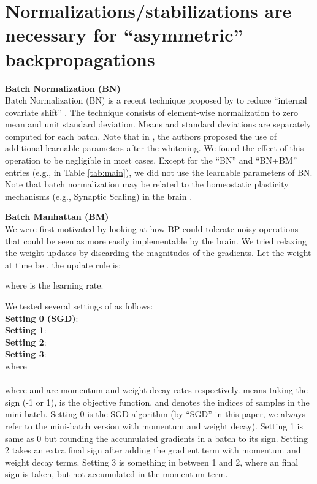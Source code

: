 \documentclass[letterpaper]{article}
\begin{document}
\section{Normalizations/stabilizations are necessary for ``asymmetric'' backpropagations}
\label{sec:normalizations}
\textbf{Batch Normalization (BN)} \\
Batch Normalization (BN) is a recent technique proposed by \cite{ioffe2015batch} to reduce ``internal covariate shift'' \cite{ioffe2015batch}. The technique consists of element-wise normalization to zero mean and unit standard deviation. Means and standard deviations are separately computed for each batch. Note that in \cite{ioffe2015batch}, the authors proposed the use of additional learnable parameters after the whitening. We found the effect of this operation to be negligible in most cases. Except for the ``BN'' and ``BN+BM'' entries (e.g., in Table \ref{tab:main}), we did not use the learnable parameters of BN. Note that batch normalization may be related to the homeostatic plasticity mechanisms (e.g., Synaptic Scaling) in the brain \cite{Turrigiano2004,stellwagen2006synaptic,turrigiano2008self}.

\textbf{Batch Manhattan (BM)} \\
We were first motivated by looking at how BP could tolerate noisy operations that could be seen as more easily implementable by the brain. We tried relaxing the weight updates by discarding the magnitudes of the gradients. Let the weight at time  be , the update rule is:


where  is the learning rate.

We tested several settings of  as follows: \\
\textbf{Setting 0 (SGD)}:  \\
\textbf{Setting 1}:  \\
\textbf{Setting 2}:  \\
\textbf{Setting 3}:  \\ where  \\
\\
where  and  are momentum and weight decay rates respectively.  means taking the sign (-1 or 1),  is the objective function, and  denotes the indices of samples in the mini-batch. Setting 0 is the SGD algorithm (by ``SGD'' in this paper, we always refer to the mini-batch version with momentum and weight decay). Setting 1 is same as 0 but rounding the accumulated gradients in a batch to its sign. Setting 2 takes an extra final sign after adding the gradient term with momentum and weight decay terms. Setting 3 is something in between 1 and 2, where an final sign is taken, but not accumulated in the momentum term. 
\end{document}
